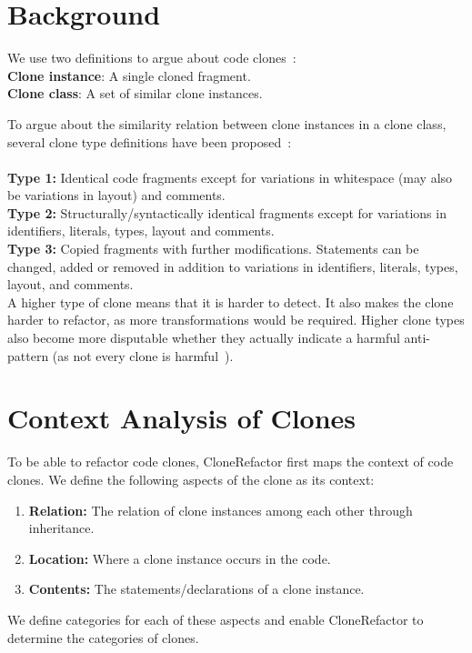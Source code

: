 \documentclass[runningheads]{llncs}
\begin{document}
\section{Background}
We use two definitions to argue about code clones~\cite{roy2007survey}:
\\ \textbf{Clone instance}: A single cloned fragment.
\\ \textbf{Clone class}: A set of similar clone instances.

To argue about the similarity relation between clone instances in a clone class, several clone type definitions have been proposed~\cite{roy2007survey}:
\\\\
\textbf{Type 1:} Identical code fragments except for variations in whitespace (may also be variations in layout) and comments.\\
\textbf{Type 2:} Structurally/syntactically identical fragments except for variations in identifiers, literals, types, layout and comments.\\
\textbf{Type 3:} Copied fragments with further modifications. Statements can be changed, added or removed in addition to variations in identifiers, literals, types, layout, and comments.\\

A higher type of clone means that it is harder to detect. It also makes the clone harder to refactor, as more transformations would be required. Higher clone types also become more disputable whether they actually indicate a harmful anti-pattern (as not every clone is harmful~\cite{jarzabek2010clones, kapser2008cloning}).

\section{Context Analysis of Clones}\label{chap:contextsetup}
To be able to refactor code clones, CloneRefactor first maps the context of code clones. We define the following aspects of the clone as its context:
\begin{enumerate}
  \item \textbf{Relation:} The relation of clone instances among each other through inheritance.
  \item \textbf{Location:} Where a clone instance occurs in the code.
  \item \textbf{Contents:} The statements/declarations of a clone instance.
\end{enumerate}
We define categories for each of these aspects and enable CloneRefactor to determine the categories of clones.
\end{document}

